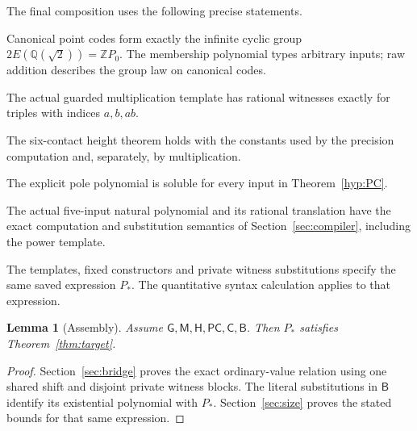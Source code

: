 \documentclass[11pt]{article}
\newtheorem{lemma}[theorem]{Lemma}
\theoremstyle{definition}
\theoremstyle{remark}
\newcommand{\Q}{\mathbb Q}
\newcommand{\Z}{\mathbb Z}
\begin{document}
The final composition uses the following precise statements.
\begin{description}[style=nextline,leftmargin=1.8cm]
\item[$\mathsf G$] Canonical point codes form exactly the infinite cyclic
group $2E(\Q(\sqrt2))=\Z P_0$. The membership polynomial types arbitrary inputs;
raw addition describes the group law on canonical codes.
\item[$\mathsf M$] The actual guarded multiplication template has rational
witnesses exactly for triples with indices $a,b,ab$.
\item[$\mathsf H$] The six-contact height theorem holds with the constants
used by the precision computation and, separately, by multiplication.
\item[$\mathsf{PC}$] The explicit pole polynomial is soluble for every
input in Theorem~\ref{hyp:PC}.
\item[$\mathsf C$] The actual five-input natural polynomial and its
rational translation have the exact computation and substitution semantics
of Section~\ref{sec:compiler}, including the power template.
\item[$\mathsf B$] The templates, fixed constructors and private witness
substitutions specify the same saved expression $P_*$. The quantitative
syntax calculation applies to that expression.
\end{description}

\begin{lemma}[Assembly]\label{lem:assembly}
Assume $\mathsf G,\mathsf M,\mathsf H,\mathsf{PC},\mathsf C,\mathsf B$.
Then $P_*$ satisfies Theorem~\ref{thm:target}.
\end{lemma}
\begin{proof}
Section~\ref{sec:bridge} proves the exact ordinary-value relation using
one shared shift and disjoint private witness blocks. The literal
substitutions in $\mathsf B$ identify its existential polynomial with
$P_*$. Section~\ref{sec:size} proves the stated bounds for that same
expression.
\end{proof}
\end{document}

